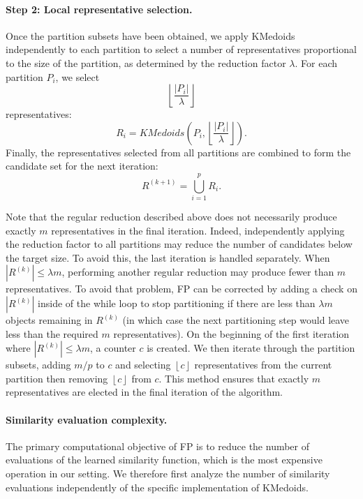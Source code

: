 \documentclass{ieeeaccess}
\newcommand{\representativeamount}{m}
\newcommand{\reductionfactor}{\lambda}
\newcommand{\kmedoidsalg}{KMedoids\xspace}
\newcommand{\partitioning}{FP\xspace}
\begin{document}
\paragraph*{Step 2: Local representative selection.}

Once the partition subsets have been obtained, we apply \kmedoidsalg independently to each partition to select a number of representatives proportional to the size of the partition, as determined by the reduction factor $\reductionfactor$. For each partition $P_i$, we select
\[
\left\lfloor \frac{|P_i|}{\reductionfactor} \right\rfloor
\]
representatives:
\[
R_i =
\kmedoidsalg\left(
P_i,
\left\lfloor \frac{|P_i|}{\reductionfactor} \right\rfloor
\right).
\]
Finally, the representatives selected from all partitions are combined to form the candidate set for the next iteration:
\[
R^{(k+1)} = \bigcup_{i=1}^{p} R_i.
\]

Note that the regular reduction described above does not necessarily produce exactly $\representativeamount$ representatives in the final iteration. Indeed, independently applying the reduction factor to all partitions may reduce the number of candidates below the target size. To avoid this, the last iteration is handled separately. When $|R^{(k)}| \leq \reductionfactor\representativeamount$, performing another regular reduction may produce fewer than $\representativeamount$ representatives. To avoid that problem, \partitioning can be corrected by adding a check on $|R^{(k)}|$ inside of the while loop to stop partitioning if there are less than $\reductionfactor\representativeamount$ objects remaining in $R^{(k)}$ (in which case the next partitioning step would leave less than the required $\representativeamount$ representatives). On the beginning of the first iteration where $|R^{(k)}| \le \reductionfactor\representativeamount$, 
a counter $c$ is created. We then iterate through the partition subsets, adding $\representativeamount/p$ to $c$ and selecting $\left\lfloor c \right\rfloor$ representatives from the current partition then removing $\left\lfloor c \right\rfloor$ from $c$. This method ensures that exactly $\representativeamount$ representatives are elected in the final iteration of the algorithm.

\paragraph*{Similarity evaluation complexity.}
The primary computational objective of \partitioning is to reduce the number of evaluations of the learned similarity function, which is the most expensive operation in our setting. We therefore first analyze the number of similarity evaluations independently of the specific implementation of \kmedoidsalg.
\end{document}
